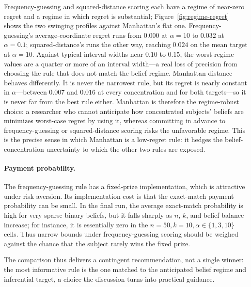 Frequency-guessing and squared-distance scoring each have a regime of near-zero regret and a regime in which regret is substantial; Figure~\ref{fig:regime-regret} shows the two swinging profiles against Manhattan's flat one.
Frequency-guessing's average-coordinate regret runs from \(0.000\) at \(\alpha=10\) to \(0.032\) at \(\alpha=0.1\); squared-distance's runs the other way, reaching \(0.024\) on the mean target at \(\alpha=10\).
Against typical interval widths near \(0.10\) to \(0.15\), the worst-regime values are a quarter or more of an interval width---a real loss of precision from choosing the rule that does not match the belief regime.
Manhattan distance behaves differently.
It is never the narrowest rule, but its regret is nearly constant in \(\alpha\)---between \(0.007\) and \(0.016\) at every concentration and for both targets---so it is never far from the best rule either.
Manhattan is therefore the regime-robust choice: a researcher who cannot anticipate how concentrated subjects' beliefs are minimizes worst-case regret by using it, whereas committing in advance to frequency-guessing or squared-distance scoring risks the unfavorable regime.
This is the precise sense in which Manhattan is a low-regret rule: it hedges the belief-concentration uncertainty to which the other two rules are exposed.

\paragraph{Payment probability.}
The frequency-guessing rule has a fixed-prize implementation, which is attractive under risk aversion.
Its implementation cost is that the exact-match payment probability can be small.
In the final run, the average exact-match probability is high for very sparse binary beliefs, but it falls sharply as \(n\), \(k\), and belief balance increase; for instance, it is essentially zero in the \(n=50,k=10,\alpha\in\{1,3,10\}\) cells.
Thus narrow bounds under frequency-guessing scoring should be weighed against the chance that the subject rarely wins the fixed prize.

The comparison thus delivers a contingent recommendation, not a single winner: the most informative rule is the one matched to the anticipated belief regime and inferential target, a choice the discussion turns into practical guidance.
